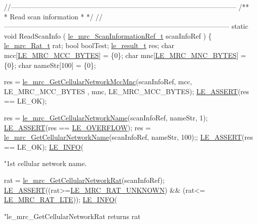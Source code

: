\begin{DoxyCodeInclude}
\textcolor{comment}{//--------------------------------------------------------------------------------------------------}\textcolor{comment}{}
\textcolor{comment}{/**}
\textcolor{comment}{ * Read scan information}
\textcolor{comment}{ *}
\textcolor{comment}{ */}
\textcolor{comment}{//--------------------------------------------------------------------------------------------------}
\textcolor{keyword}{static} \textcolor{keywordtype}{void} ReadScanInfo
(
    \hyperlink{le__mrc__interface_8h_a3e7fe3e0d8f10fe7853f00eb254529ea}{le\_mrc\_ScanInformationRef\_t}     scanInfoRef
)
\{
    \hyperlink{le__mrc__interface_8h_aaf23906c37ad59fb96a8a48f7fab5b43}{le\_mrc\_Rat\_t} rat;
    \textcolor{keywordtype}{bool} boolTest;
    \hyperlink{le__basics_8h_a1cca095ed6ebab24b57a636382a6c86c}{le\_result\_t} res;
    \textcolor{keywordtype}{char} mcc[\hyperlink{le__mrc__interface_8h_aec88b97b54a45f86e6cb34f65b2d0afd}{LE\_MRC\_MCC\_BYTES}] = \{0\};
    \textcolor{keywordtype}{char} mnc[\hyperlink{le__mrc__interface_8h_aeae0e240c77730be724ad7ac42596469}{LE\_MRC\_MNC\_BYTES}] = \{0\};
    \textcolor{keywordtype}{char} nameStr[100] = \{0\};

    res = \hyperlink{le__mrc__interface_8h_aad275d839efe8b2b5eafe65ef87bd3d3}{le\_mrc\_GetCellularNetworkMccMnc}(scanInfoRef, mcc, LE\_MRC\_MCC\_BYTES
      , mnc, LE\_MRC\_MCC\_BYTES);
    \hyperlink{le__log_8h_ac0dbbef91dc0fed449d0092ff0557b39}{LE\_ASSERT}(res == LE\_OK);

    res = \hyperlink{le__mrc__interface_8h_a6fcb9785c79cb9f8a4d1bef2484ca9d5}{le\_mrc\_GetCellularNetworkName}(scanInfoRef, nameStr, 1);
    \hyperlink{le__log_8h_ac0dbbef91dc0fed449d0092ff0557b39}{LE\_ASSERT}(res == \hyperlink{le__basics_8h_a1cca095ed6ebab24b57a636382a6c86cae42c9d785827fc3a9c47fb55baca7879}{LE\_OVERFLOW});
    res = \hyperlink{le__mrc__interface_8h_a6fcb9785c79cb9f8a4d1bef2484ca9d5}{le\_mrc\_GetCellularNetworkName}(scanInfoRef, nameStr, 100);;
    \hyperlink{le__log_8h_ac0dbbef91dc0fed449d0092ff0557b39}{LE\_ASSERT}(res == LE\_OK);
    \hyperlink{le__log_8h_a23e6d206faa64f612045d688cdde5808}{LE\_INFO}(\textcolor{stringliteral}{"1st cellular network name.%

    rat = \hyperlink{le__mrc__interface_8h_ad33fbe1d2b7acee0e47f3e54cab78274}{le\_mrc\_GetCellularNetworkRat}(scanInfoRef);
    \hyperlink{le__log_8h_ac0dbbef91dc0fed449d0092ff0557b39}{LE\_ASSERT}((rat>=\hyperlink{le__mrc__interface_8h_aaf23906c37ad59fb96a8a48f7fab5b43a6088198c65a39429fe6a67f322df0480}{LE\_MRC\_RAT\_UNKNOWN}) && (rat<=
      \hyperlink{le__mrc__interface_8h_aaf23906c37ad59fb96a8a48f7fab5b43aaf2b25a8ec75f9bacb51967f23247176}{LE\_MRC\_RAT\_LTE}));
    \hyperlink{le__log_8h_a23e6d206faa64f612045d688cdde5808}{LE\_INFO}(\textcolor{stringliteral}{"le\_mrc\_GetCellularNetworkRat returns rat %

}}
\end{DoxyCodeInclude}
